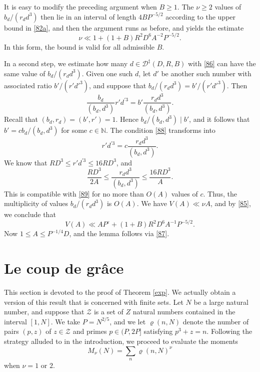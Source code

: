 \documentclass[reqno]{amsart}
\newcommand\eps{\varepsilon}
\renewcommand\rho{\varrho}
\numberwithin{equation}{section}
\begin{document}
It is easy to modify the preceding argument when $B \geq 1$. The $\nu \geq 2$ values of $b_d/(r_d d^3)$ then lie in an interval of length $4B P^{-5/2}$ according to the upper bound in \eqref{82a}, and then the argument runs as before, and yields the estimate
\begin{equation}\label{85}\nu \ll 1 + (1 + B) R^2 D^6 A^{-2} P^{-5/2}. \end{equation}
In this form, the bound is valid for all admissible $B$.

In a second step, we estimate how many $d \in \mathscr{D}^\ddagger(D,R,B)$ with \eqref{86} can have the same value of $b_d/(r_d d^3)$. Given one such $d$, let $d'$ be another such number with associated ratio $b'/(r' d'^3)$, and suppose that $b_d/(r_d d^3) = b'/(r' d'^3)$. Then
\begin{equation}\label{88}\frac{b_d}{(b_d, d^3)} r' d^{\prime 3} = b' \frac{r_d d^3}{(b_d, d^3)}.\end{equation}
Recall that $(b_d, r_d) = (b', r') = 1$. Hence $b_d/(b_d,d^3)\mid b'$, and
it follows that $b' = c b_d/(b_d, d^3)$ for some $c \in \mathbb{N}$. The condition \eqref{88} transforms into
\begin{equation}\label{89}r' d^{\prime 3} = c \frac{r_d d^3}{(b_d, d^3)}. \end{equation}
We know that $R D^3 \leq r' d^{\prime 3} \leq 16 R D^3$, and
$$
\frac{R D^3}{2 A} \leq \frac{r_d d^3}{(b_d, d^3)} \leq \frac{16 R D^3}{A}.
$$
This is compatible with \eqref{89} for no more than $O(A)$ values of $c$. Thus, the multiplicity of values $b_d/(r_d d^3)$ is $O(A)$. We have $V(A) \ll \nu A$,
and by \eqref{85}, we conclude that
$$V(A) \ll A P^{\eps} + (1 + B) R^2 D^6 A^{-1} P^{-5/2}.$$
Now $1 \leq A \leq P^{-1/4} D$, and the lemma follows via \eqref{87}.


\section{Le coup de gr\^ace} This section is devoted to the proof of Theorem \ref{exp}. We actually obtain a version of this result that  is concerned with finite sets. Let $N$ be a large natural number, and suppose that $\mathscr Z$ is a set of $Z$ natural numbers contained in the interval $[1,N]$. We take $P=N^{2/5}$, and we let $\rho(n,N)$ denote the number of pairs $(p,z)$ of $z\in\mathscr Z$ and primes $p\in(P,2P]$ satisfying
$ p^3+z = n $. Following the strategy alluded to in the introduction, we proceed to evaluate the moments
\begin{equation}\label{91} M_\nu (N) = \sum_n \rho(n,N)^\nu \end{equation}
when $\nu =1$ or $2$.
\end{document}
